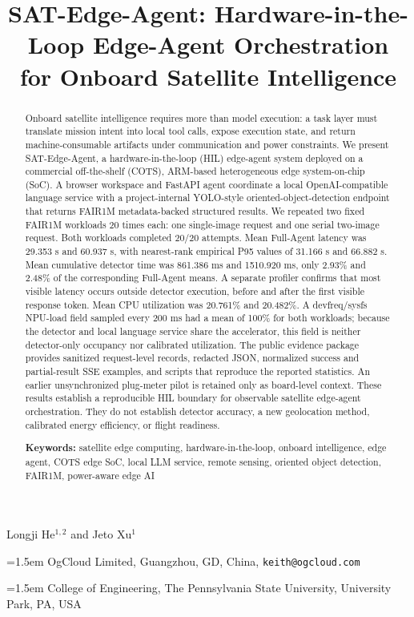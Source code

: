 \documentclass[10pt,letterpaper]{article}
\title{SAT-Edge-Agent: Hardware-in-the-Loop Edge-Agent Orchestration\\
for Onboard Satellite Intelligence}
\author{}
\date{}
\newcommand{\affline}[2]{%
  \noindent\hangindent=1.5em\hangafter=1%
  \makebox[1.5em][r]{\textsuperscript{#1}}#2\par
}
\begin{document}
\maketitle
\vspace{-4.4em}
\begin{center}
{\fontsize{12}{15}\selectfont
Longji He$^{1,2}$ and Jeto Xu$^{1}$}
\end{center}
\vspace{0.55em}
{\fontsize{10}{14}\selectfont
\affline{1}{OgCloud Limited, Guangzhou, GD, China, \texttt{keith@ogcloud.com}}
\affline{2}{College of Engineering, The Pennsylvania State University, University Park, PA, USA}
}
\vspace{0.85em}

\begin{abstract}

Onboard satellite intelligence requires more than model execution: a task layer must translate mission intent into local tool calls, expose execution state, and return machine-consumable artifacts under communication and power constraints. We present SAT-Edge-Agent, a hardware-in-the-loop (HIL) edge-agent system deployed on a commercial off-the-shelf (COTS), ARM-based heterogeneous edge system-on-chip (SoC). A browser workspace and FastAPI agent coordinate a local OpenAI-compatible language service with a project-internal YOLO-style oriented-object-detection endpoint that returns FAIR1M metadata-backed structured results. We repeated two fixed FAIR1M workloads 20 times each: one single-image request and one serial two-image request. Both workloads completed 20/20 attempts. Mean Full-Agent latency was 29.353 s and 60.937 s, with nearest-rank empirical P95 values of 31.166 s and 66.882 s. Mean cumulative detector time was 861.386 ms and 1510.920 ms, only 2.93\% and 2.48\% of the corresponding Full-Agent means. A separate profiler confirms that most visible latency occurs outside detector execution, before and after the first visible response token. Mean CPU utilization was 20.761\% and 20.482\%. A devfreq/sysfs NPU-load field sampled every 200 ms had a mean of 100\% for both workloads; because the detector and local language service share the accelerator, this field is neither detector-only occupancy nor calibrated utilization. The public evidence package provides sanitized request-level records, redacted JSON, normalized success and partial-result SSE examples, and scripts that reproduce the reported statistics. An earlier unsynchronized plug-meter pilot is retained only as board-level context. These results establish a reproducible HIL boundary for observable satellite edge-agent orchestration. They do not establish detector accuracy, a new geolocation method, calibrated energy efficiency, or flight readiness.

\textbf{Keywords:} satellite edge computing, hardware-in-the-loop, onboard intelligence, edge agent, COTS edge SoC, local LLM service, remote sensing, oriented object detection, FAIR1M, power-aware edge AI
\end{abstract}
\end{document}
